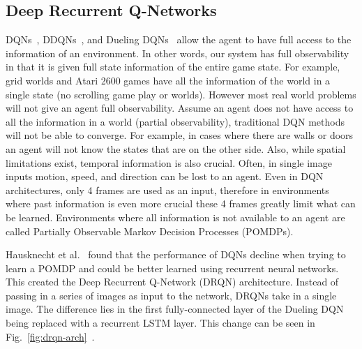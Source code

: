 \documentclass[12pt,american]{report}
\begin{document}
\subsection{Deep Recurrent Q-Networks}
\label{sec:drqn}
DQNs~\cite{atari}, DDQNs~\cite{van2016deep}, and Dueling DQNs~\cite{wang2015dueling} allow the agent to have full access to the information of an environment. In other words, our system has full observability in that it is given full state information of the entire game state.  For example, grid worlds and Atari 2600 games have all the information of the world in a single state (no scrolling game play or worlds). However most real world problems will not give an agent full observability. Assume an agent does not have access to all the information in a world (partial observability), traditional DQN methods will not be able to converge. For example, in cases where there are walls or doors an agent will not know the states that are on the other side. Also, while spatial limitations exist, temporal information is also crucial.  Often, in single image inputs motion, speed, and direction can be lost to an agent. Even in DQN architectures, only 4 frames are used as an input, therefore in environments where past information is even more crucial these 4 frames greatly limit what can be learned. Environments where all information is not available to an agent are called Partially Observable Markov Decision Processes (POMDPs).  

Hausknecht et al.~\cite{HausknechtDRQN} found that the performance of DQNs decline when trying to learn a POMDP and could be better learned using recurrent neural networks. This created the Deep Recurrent Q-Network (DRQN) architecture. Instead of passing in a series of images as input to the network, DRQNs take in a single image. The difference lies in the first fully-connected layer of the Dueling DQN being replaced with a recurrent LSTM layer. This change can be seen in Fig.~\ref{fig:drqn-arch}~\cite{HausknechtDRQN}.
\end{document}
